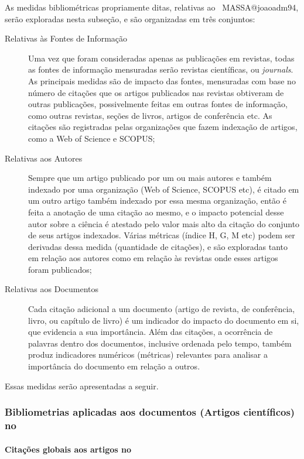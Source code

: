 As medidas bibliométricas propriamente ditas, relativas ao \dataset\ MASSA@joaoadm94, serão exploradas nesta subseção, e são organizadas em três conjuntos:
\begin{description}
    \item [Relativas às Fontes de Informação] Uma vez que foram consideradas apenas as publicações em revistas, todas as fontes de informação mensuradas serão revistas científicas, ou \textit{journals}. As principais medidas são de impacto das fontes, mensuradas com base no número de citações que os artigos publicados nas revistas obtiveram de outras publicações, possivelmente feitas em outras fontes de informação, como outras revistas, seções de livros, artigos de conferência etc. As citações são registradas pelas organizações que fazem indexação de artigos, como a Web of Science e SCOPUS;
    \item [Relativas aos Autores] Sempre que um artigo publicado por um ou mais autores e também indexado por uma organização (Web of Science,  SCOPUS etc), é citado em um outro artigo também indexado por essa mesma organização, então é feita a anotação de uma citação ao mesmo, e o impacto potencial desse autor sobre a ciência é atestado pelo valor mais alto da citação do conjunto de seus artigos indexados. Várias métricas (índice H, G, M etc) podem ser derivadas dessa medida (quantidade de citações), e são exploradas tanto em relação aos autores como em relação às revistas onde esses artigos foram publicados;
    \item [Relativas aos Documentos] Cada citação adicional a  um documento (artigo de revista, de conferência, livro, ou  capítulo de livro) é um indicador do impacto do documento em si, que evidencia a sua importância. Além das citações, a ocorrência de palavras dentro dos documentos, inclusive ordenada pelo tempo, também produz indicadores numéricos (métricas) relevantes para analisar a importância do documento em relação a outros. 
\end{description}

Essas medidas serão apresentadas a seguir.

\subsubsection{Bibliometrias aplicadas aos documentos (Artigos científicos) no \dataset}

\paragraph{Citações globais aos artigos no \dataset}

